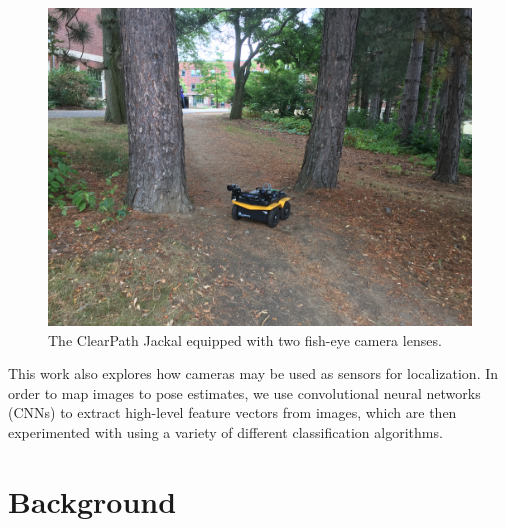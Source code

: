 \documentclass[letterpaper, 12 pt, conference]{ieeeconf}  %
\begin{document}
\begin{figure}[h]
\centering
\includegraphics[scale=0.15]{JackalPose}
\caption{The ClearPath Jackal equipped with two fish-eye camera lenses.}
\end{figure}

\par 
This work also explores how cameras may be used as sensors for localization. In order to map images to pose estimates, we use convolutional neural networks (CNNs) to extract high-level feature vectors from images, which are then experimented with using a variety of different classification algorithms. 

\section{Background}
\end{document}
